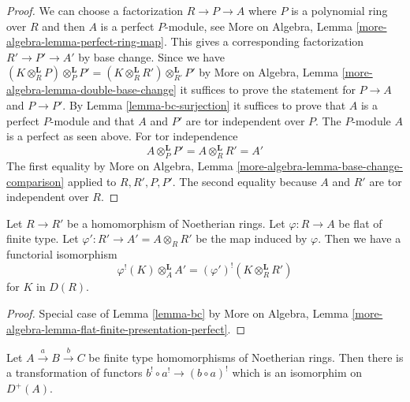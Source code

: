 \begin{proof}
We can choose a factorization $R \to P \to A$ where $P$ is a polynomial
ring over $R$ and then $A$ is a perfect $P$-module, see
More on Algebra, Lemma \ref{more-algebra-lemma-perfect-ring-map}.
This gives a corresponding factorization
$R' \to P' \to A'$ by base change. Since we have
$(K \otimes_R^\mathbf{L} P) \otimes_P^\mathbf{L} P' =
(K \otimes_R^\mathbf{L} R') \otimes_{R'}^\mathbf{L} P'$
by More on Algebra, Lemma \ref{more-algebra-lemma-double-base-change}
it suffices to prove the statement for
$P \to A$ and $P \to P'$.
By Lemma \ref{lemma-bc-surjection}
it suffices to prove that $A$ is a perfect $P$-module
and that $A$ and $P'$ are tor independent over $P$.
The $P$-module $A$ is a perfect as seen above.
For tor independence
$$
A \otimes_P^\mathbf{L} P' = A \otimes_R^\mathbf{L} R' = A'
$$
The first equality by
More on Algebra, Lemma \ref{more-algebra-lemma-base-change-comparison}
applied to $R, R', P, P'$. The second equality because
$A$ and $R'$ are tor independent over $R$.
\end{proof}

\begin{lemma}
\label{lemma-bc-flat}
Let $R \to R'$ be a homomorphism of Noetherian rings.
Let $\varphi : R \to A$ be flat of finite type.
Let $\varphi' : R' \to A' = A \otimes_R R'$ be the map induced by $\varphi$.
Then we have a functorial isomorphism
$$
\varphi^!(K) \otimes_A^\mathbf{L} A' =
(\varphi')^!(K \otimes_R^\mathbf{L} R')
$$
for $K$ in $D(R)$.
\end{lemma}

\begin{proof}
Special case of Lemma \ref{lemma-bc} by
More on Algebra, Lemma
\ref{more-algebra-lemma-flat-finite-presentation-perfect}.
\end{proof}

\begin{lemma}
\label{lemma-composition-shriek-algebraic}
Let $A \xrightarrow{a} B \xrightarrow{b} C$ be finite type homomorphisms of
Noetherian rings. Then there is a transformation of functors
$b^! \circ a^! \to (b \circ a)^!$ which is an isomorphim on $D^+(A)$.
\end{lemma}

